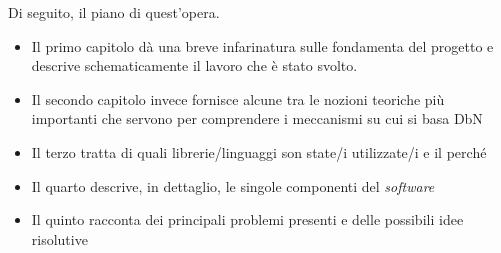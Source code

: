 Di seguito, il piano di quest'opera.
\begin{itemize}
	\item Il primo capitolo dà una breve infarinatura sulle fondamenta del progetto e descrive schematicamente il lavoro che è stato svolto.
	\item Il secondo capitolo invece fornisce alcune tra le nozioni teoriche più importanti che
	servono per comprendere i meccanismi su cui si basa DbN
	\item Il terzo tratta di quali librerie/linguaggi son state/i utilizzate/i e il perché
	\item Il quarto descrive, in dettaglio, le singole componenti del \textit{software}
	\item Il quinto racconta dei principali problemi presenti e delle possibili idee risolutive
\end{itemize}